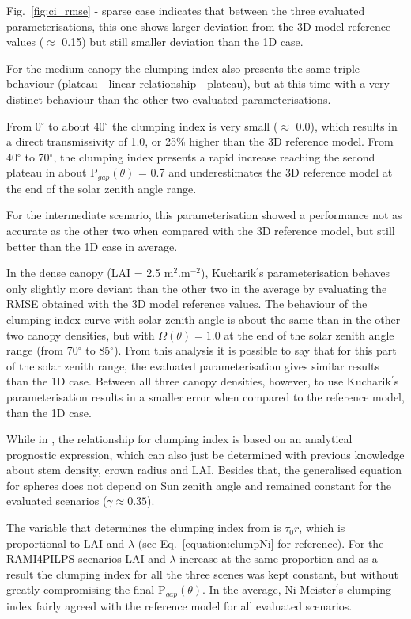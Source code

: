 \documentclass[a4paper,11pt]{report}
\begin{document}
Fig.~\ref{fig:ci_rmse} - sparse case indicates that between the three evaluated parameterisations, this one shows larger deviation from the 3D model reference values ($\approx$ 0.15) but still smaller deviation than the 1D case.

For the medium canopy the clumping index also presents the same triple behaviour (plateau - linear relationship - plateau), but at this time with a very distinct behaviour than the other two evaluated parameterisations.

From 0$^{\circ}$ to about 40$^{\circ}$ the clumping index is very small ($\approx$ 0.0), which results in a direct transmissivity of 1.0, or 25\% higher than the 3D reference model. From 40$^{\circ}$ to 70$^{\circ}$, the clumping index presents a rapid increase reaching the second plateau in about P$_{gap}(\theta)$ = 0.7 and underestimates the 3D reference model at the end of the solar zenith angle range.

For the intermediate scenario, this parameterisation showed a performance not as accurate as the other two when compared with the 3D reference model, but still better than the 1D case in average.

In the dense canopy (LAI = 2.5 m$^2$.m$^{-2}$), Kucharik$^{\prime}$s parameterisation behaves only slightly more deviant than the other two in the average by evaluating the RMSE obtained with the 3D model reference values. The behaviour of the clumping index curve with solar zenith angle is about the same than in the other two canopy densities, but with $\Omega(\theta) = 1.0$ at the end of the solar zenith angle range (from 70$^{\circ}$ to 85$^{\circ}$). From this analysis it is possible to say that for this part of the solar zenith range, the evaluated parameterisation gives similar results than the 1D case. Between all three canopy densities, however, to use Kucharik$^{\prime}$s parameterisation results in a smaller error when compared to the reference model, than the 1D case.

While in \citet{Ni-Meister2010}, the relationship for clumping index is based on an analytical prognostic expression, which can also just be determined with previous knowledge about stem density, crown radius and LAI. Besides that, the generalised equation for spheres does not depend on Sun zenith angle and remained constant for the evaluated scenarios ($\gamma \approx 0.35$).

The variable that determines the clumping index from \citet{Ni-Meister2010} is $\tau_0r$, which is proportional to LAI and $\lambda$ (see Eq.~\ref{equation:clumpNi} for reference). For the RAMI4PILPS scenarios LAI and $\lambda$ increase at the same proportion and as a result the clumping index for all the three scenes was kept constant, but without greatly compromising the final P$_{gap}(\theta)$. In the average, Ni-Meister$^{\prime}$s clumping index fairly agreed with the reference model for all evaluated scenarios.
\end{document}
